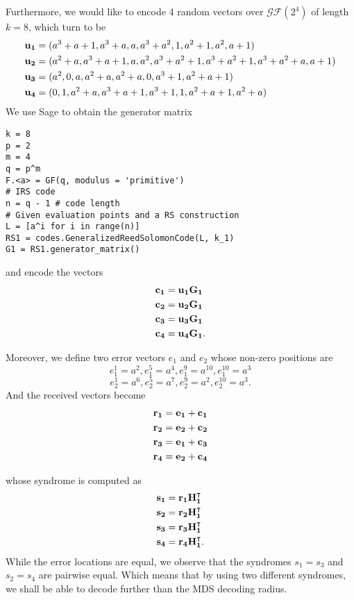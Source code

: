 \documentclass{article}
\begin{document}
Furthermore, we would like to encode 4 random vectors over $\mathcal{GF}(2^4)$ of length $k=8$, which turn to be
\begin{align*}
\vb{u_{1}} &= (a^3 + a + 1, a^3 + a, a, a^3 + a^2, 1, a^2 + 1, a^2, a + 1) \\
\vb{u_{2}} &= (a^2 + a, a^3 + a + 1, a, a^2, a^3 + a^2 + 1, a^3 + a^2 + 1, a^3 + a^2 + a, a + 1) \\
\vb{u_{3}} &= (a^2, 0, a, a^2 + a, a^2 + a, 0, a^3 + 1, a^2 + a + 1) \\
\vb{u_{4}} &= (0, 1, a^2 + a, a^3 + a + 1, a^3 + 1, 1, a^2 + a + 1, a^2 + a)
\end{align*}
\newpage
We use Sage to obtain the generator matrix
\begin{verbatim}
k = 8
p = 2
m = 4
q = p^m
F.<a> = GF(q, modulus = 'primitive')
# IRS code
n = q - 1 # code length
# Given evaluation points and a RS construction
L = [a^i for i in range(n)]
RS1 = codes.GeneralizedReedSolomonCode(L, k_1)
G1 = RS1.generator_matrix()
\end{verbatim}
and encode the vectors
\begin{align*}
\vb{c_{1}} &= \vb{u_{1}}\vb{G_1}\\
\vb{c_{2}} &= \vb{u_{2}}\vb{G_1}\\
\vb{c_{3}} &= \vb{u_{3}}\vb{G_1}\\
\vb{c_{4}} &= \vb{u_{4}}\vb{G_1}.
\end{align*} 

Moreover, we define two error vectors $e_1$ and $e_2$ whose non-zero positions are
\begin{equation*}
e_1^1 = a^2, e_1^5 = a^4, e_1^9 = a^{10}, e_1^{10} = a^3
\end{equation*} 
\begin{equation*}
e_2^1 = a^6, e_2^5 = a^7, e_2^9 = a^2, e_2^{10} = a^3.
\end{equation*} 
And the received vectors become
\begin{align*}
\vb{r_1} &= \vb{e_1} + \vb{c_1} \\
\vb{r_2} &= \vb{e_2} + \vb{c_2} \\
\vb{r_3} &= \vb{e_1} + \vb{c_3} \\
\vb{r_4} &= \vb{e_2} + \vb{c_4} 
\end{align*}

whose syndrome is computed as
\begin{align*}
\vb{s_{1}} &= \vb{r_{1}}\vb{H_1^\intercal}\\
\vb{s_{2}} &= \vb{r_{2}}\vb{H_1^\intercal}\\
\vb{s_{3}} &= \vb{r_{3}}\vb{H_1^\intercal}\\
\vb{s_{4}} &= \vb{r_{4}}\vb{H_1^\intercal}.
\end{align*}
While the error locations are equal, we observe that the syndromes $s_{1} = s_{3}$ and $s_{2} = s_{4}$ are pairwise equal. Which means that by using two different syndromes, we shall be able to decode further than the MDS decoding radius.
\end{document}
